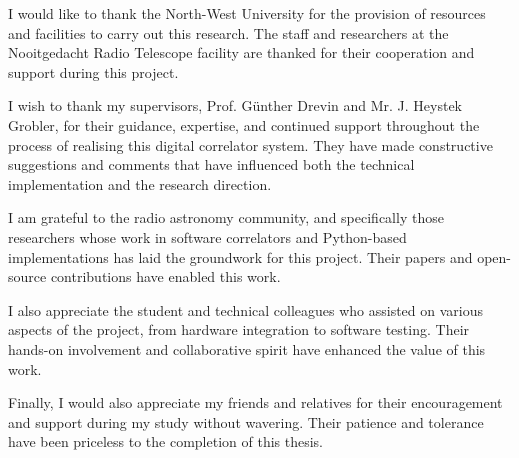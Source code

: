 \documentclass[a4paper,oneside,11pt]{book}
\begin{document}

\newcommand{\cosupervisor}{Mr. J. Heystek Grobler}
\newcommand{\assistantsupervisor}{}

\newcommand{\keywords}[1]{\vspace{1em}\noindent\textbf{Keywords: }#1}

\date{\today}


\MakeTitle


\begin{Acknowledgements}{}
    I would like to thank the North-West University for the provision of resources and facilities to carry out this research. The staff and researchers at the Nooitgedacht Radio Telescope facility are thanked for their cooperation and support during this project.
    
    I wish to thank my supervisors, Prof. Günther Drevin and Mr. J. Heystek Grobler, for their guidance, expertise, and continued support throughout the process of realising this digital correlator system. They have made constructive suggestions and comments that have influenced both the technical implementation and the research direction.
    
    I am grateful to the radio astronomy community, and specifically those researchers whose work in software correlators and Python-based implementations has laid the groundwork for this project. Their papers and open-source contributions have enabled this work.
    
    I also appreciate the student and technical colleagues who assisted on various aspects of the project, from hardware integration to software testing. Their hands-on involvement and collaborative spirit have enhanced the value of this work.
    
    Finally, I would also appreciate my friends and relatives for their encouragement and support during my study without wavering. Their patience and tolerance have been priceless to the completion of this thesis.
\end{Acknowledgements}
\end{document}
